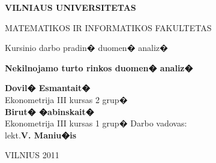 \documentclass[a4paper]{article}
\begin{document}
\begin{titlepage}

\centerline{\bf \large VILNIAUS UNIVERSITETAS}
\bigskip
\centerline{\large MATEMATIKOS IR INFORMATIKOS FAKULTETAS}
\vskip 120pt
\vskip 50pt
\centerline{\Large Kursinio darbo pradin� duomen� analiz�}
\begin{center}
    {\bf \huge Nekilnojamo turto rinkos duomen� analiz�\\
    \smallskip  
    \smallskip}
\end{center}
\bigskip
\vskip 120pt
\raggedleft
{\large\textbf{Dovil� Esmantait�}\\Ekonometrija III kursas 2 grup�\\ \textbf{Birut� �abinskait�}\\Ekonometrija III kursas 1 grup�}
\vskip 10pt
{\large Darbo vadovas:\\ lekt.\textbf{V. Maniu�is}}
\vskip 90pt
\centerline{\large VILNIUS 2011}
\end{titlepage}
\newpage
\end{document}
